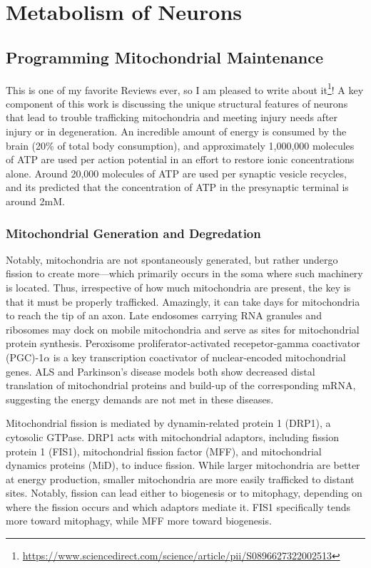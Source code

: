 \chapter{Metabolism of Neurons}

\section{Programming Mitochondrial Maintenance}

This is one of my favorite Reviews ever, so I am pleased to write about it\footnote{\url{https://www.sciencedirect.com/science/article/pii/S0896627322002513}}! A key component of this work is discussing the unique structural features of neurons that lead to trouble trafficking mitochondria and meeting injury needs after injury or in degeneration. An incredible amount of energy is consumed by the brain (20\% of total body consumption), and approximately 1,000,000 molecules of ATP are used per action potential in an effort to restore ionic concentrations alone. Around 20,000 molecules of ATP are used per synaptic vesicle recycles, and its predicted that the concentration of ATP in the presynaptic terminal is around 2mM.

\subsection{Mitochondrial Generation and Degredation}

Notably, mitochondria are not spontaneously generated, but rather undergo fission to create more---which primarily occurs in the soma where such machinery is located. Thus, irrespective of how much mitochondria are present, the key is that it must be properly trafficked. Amazingly, it can take days for mitochondria to reach the tip of an axon. Late endosomes carrying RNA granules and ribosomes may dock on mobile mitochondria and serve as sites for mitochondrial protein synthesis. Peroxisome proliferator-activated recepetor-gamma coactivator (PGC)-1$\alpha$ is a key transcription coactivator of nuclear-encoded mitochondrial genes. ALS and Parkinson's disease models both show decreased distal translation of mitochondrial proteins and build-up of the corresponding mRNA, suggesting the energy demands are not met in these diseases.\newline

Mitochondrial fission is mediated by dynamin-related protein 1 (DRP1), a cytosolic GTPase. DRP1 acts with mitochondrial adaptors, including fission protein 1 (FIS1), mitochondrial fission factor (MFF), and mitochondrial dynamics proteins (MiD), to induce fission. While larger mitochondria are better at energy production, smaller mitochondria are more easily trafficked to distant sites. Notably, fission can lead either to biogenesis or to mitophagy, depending on where the fission occurs and which adaptors mediate it. FIS1 specifically tends more toward mitophagy, while MFF more toward biogenesis.\newline

